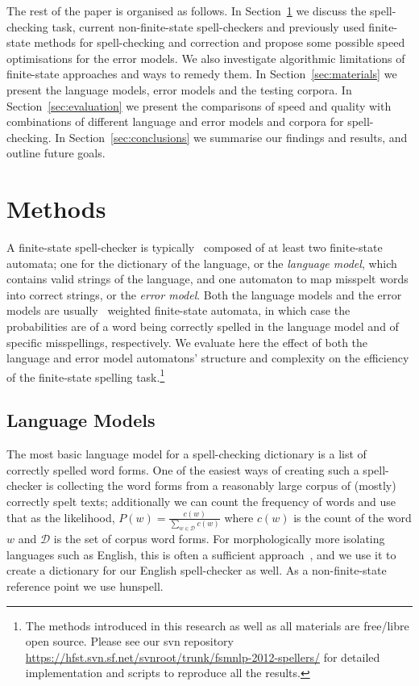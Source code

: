 \documentclass[11pt]{article}
\begin{document}
The rest of the paper is organised as follows. In Section~\ref{sec:methods} we
discuss the spell-checking task, current non-finite-state spell-checkers and
previously used finite-state methods for spell-checking and correction and
propose some possible speed optimisations for the error models.
We also investigate algorithmic limitations of finite-state approaches and
ways to remedy them. In
Section~\ref{sec:materials} we present the language models, error models and the
testing corpora. In Section~\ref{sec:evaluation} we
present the comparisons of speed and quality with combinations of different
language and error models and corpora for spell-checking. In
Section~\ref{sec:conclusions} we summarise our findings and results,
and outline future goals.


\section{Methods}
\label{sec:methods}

A finite-state spell-checker is typically~\cite{pirinen/2010/lrec}
composed of at least two finite-state
automata; one for the dictionary of the language, or the \emph{language model},
which contains valid strings of the language, and one automaton to map misspelt
words into correct strings, or the \emph{error model}. Both the language models
and the error models are usually~\cite{pirinen/2010/lrec}
weighted finite-state automata, in which
case the probabilities are of a word being correctly spelled in the language
model and of specific misspellings, respectively.
We evaluate here the effect of both the language and error model automatons'
structure and complexity on the efficiency of the finite-state
spelling task.\footnote{The methods introduced in this research
as well as all materials are free/libre open source. Please see our svn
repository \url{https://hfst.svn.sf.net/svnroot/trunk/fsmnlp-2012-spellers/}
for detailed implementation and scripts to reproduce all the
results.}

\subsection{Language Models}
\label{subsec:language-models}

The most basic language model for a spell-checking dictionary is a list of
correctly spelled word forms. One of the easiest ways of creating such a
spell-checker is collecting the word forms from a reasonably large corpus of
(mostly) correctly spelt texts; additionally we can count the frequency of words
and use that as the likelihood,
$P(w)=\frac{c(w)}{\sum_{w \in \mathcal{D} } c(w)}$ where $c(w)$ is the
count of the word $w$ and $\mathcal{D}$ is the set of corpus word forms.
For morphologically more isolating languages such as English, this is
often a sufficient
approach~\cite{norvig/2010}, and we use it to create a dictionary
for our English
spell-checker as well. As a non-finite-state reference point we use
hunspell.
\end{document}

